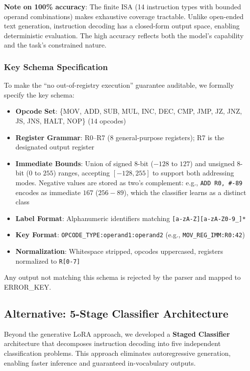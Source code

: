 \documentclass[11pt,a4paper]{article}
\begin{document}
\textbf{Note on 100\% accuracy}: The finite ISA (14 instruction types with bounded operand combinations) makes exhaustive coverage tractable. Unlike open-ended text generation, instruction decoding has a closed-form output space, enabling deterministic evaluation. The high accuracy reflects both the model's capability and the task's constrained nature.

\subsubsection{Key Schema Specification}

To make the ``no out-of-registry execution'' guarantee auditable, we formally specify the key schema:

\begin{itemize}
    \item \textbf{Opcode Set}: \{MOV, ADD, SUB, MUL, INC, DEC, CMP, JMP, JZ, JNZ, JS, JNS, HALT, NOP\} (14 opcodes)
    \item \textbf{Register Grammar}: R0--R7 (8 general-purpose registers); R7 is the designated output register
    \item \textbf{Immediate Bounds}: Union of signed 8-bit ($-128$ to $127$) and unsigned 8-bit ($0$ to $255$) ranges, accepting $[-128, 255]$ to support both addressing modes. Negative values are stored as two's complement: e.g., \texttt{ADD R0, \#-89} encodes as immediate $167$ ($256-89$), which the classifier learns as a distinct class
    \item \textbf{Label Format}: Alphanumeric identifiers matching \texttt{[a-zA-Z][a-zA-Z0-9\_]*}
    \item \textbf{Key Format}: \texttt{OPCODE\_TYPE:operand1:operand2} (e.g., \texttt{MOV\_REG\_IMM:R0:42})
    \item \textbf{Normalization}: Whitespace stripped, opcodes uppercased, registers normalized to \texttt{R[0-7]}
\end{itemize}

Any output not matching this schema is rejected by the parser and mapped to ERROR\_KEY.

\subsection{Alternative: 5-Stage Classifier Architecture}

Beyond the generative LoRA approach, we developed a \textbf{Staged Classifier} architecture that decomposes instruction decoding into five independent classification problems. This approach eliminates autoregressive generation, enabling faster inference and guaranteed in-vocabulary outputs.
\end{document}

